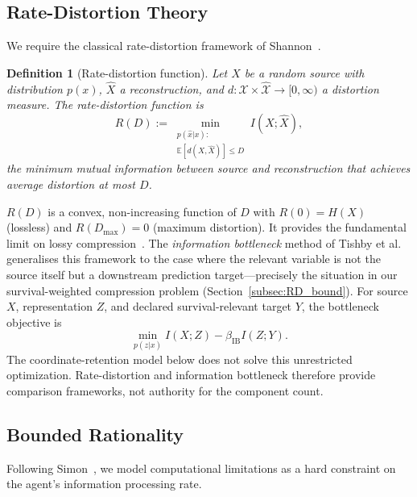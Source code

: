 \documentclass[12pt]{article}
\newtheorem{definition}[theorem]{Definition}
\begin{document}
\subsection{Rate-Distortion Theory}
\label{subsec:RD}

We require the classical rate-distortion framework
of Shannon~\cite{Shannon1959}.

\begin{definition}[Rate-distortion function]
\label{def:RD}
Let $X$ be a random source with distribution $p(x)$,
$\hat{X}$ a reconstruction, and
$d: \mathcal{X} \times \hat{\mathcal{X}} \to [0,\infty)$
a distortion measure.
The \emph{rate-distortion function} is
\begin{equation}
\label{eq:RD}
R(D) := \min_{\substack{p(\hat{x}|x):\\
  \mathbb{E}[d(X,\hat{X})] \leq D}} I(X; \hat{X}),
\end{equation}
the minimum mutual information between source and
reconstruction that achieves average distortion at most $D$.
\end{definition}

$R(D)$ is a convex, non-increasing function of $D$ with
$R(0) = H(X)$ (lossless) and
$R(D_{\max}) = 0$ (maximum distortion).
It provides the fundamental limit on lossy
compression~\cite{CoverThomas2006}.
The \emph{information bottleneck} method of
Tishby et al.~\cite{Tishby2000} generalises this framework
to the case where the relevant variable is not the source
itself but a downstream prediction target---precisely the
situation in our survival-weighted compression problem
(Section~\ref{subsec:RD_bound}).
For source $X$, representation $Z$, and declared survival-relevant
target $Y$, the bottleneck objective is
\begin{equation}
\min_{p(z|x)} I(X;Z)-\beta_{\mathrm{IB}} I(Z;Y).
\end{equation}
The coordinate-retention model below does not solve this unrestricted
optimization.  Rate-distortion and information bottleneck therefore
provide comparison frameworks, not authority for the component count.

\subsection{Bounded Rationality}
\label{subsec:bounded}

Following Simon~\cite{Simon1955}, we model computational
limitations as a hard constraint on the agent's information
processing rate.
\end{document}
